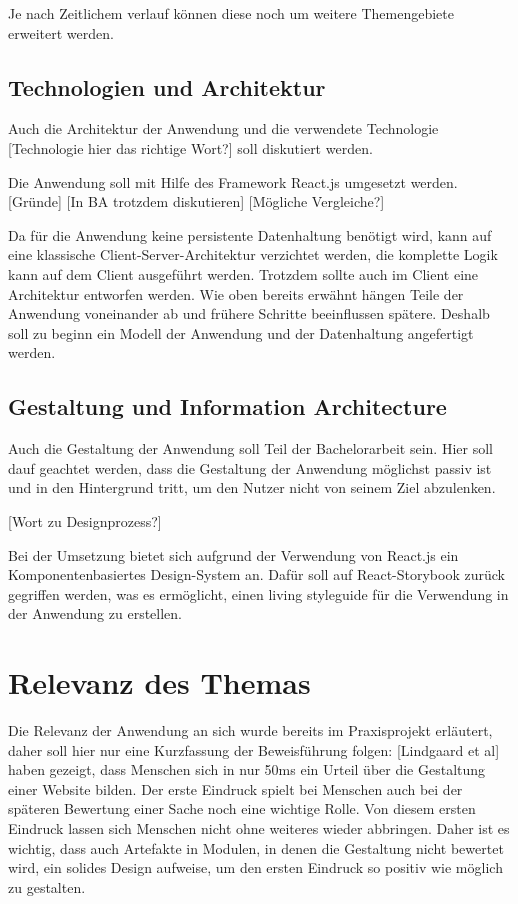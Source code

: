Je nach Zeitlichem verlauf können diese noch um weitere Themengebiete erweitert werden.

\subsection{Technologien und Architektur}
Auch die Architektur der Anwendung und die verwendete Technologie [Technologie hier das richtige Wort?] soll diskutiert werden.

Die Anwendung soll mit Hilfe des Framework React.js umgesetzt werden.
[Gründe]
[In BA trotzdem diskutieren]
[Mögliche Vergleiche?]

Da für die Anwendung keine persistente Datenhaltung benötigt wird, kann auf eine klassische Client-Server-Architektur verzichtet werden, die komplette Logik kann auf dem Client ausgeführt werden.
Trotzdem sollte auch im Client eine Architektur entworfen werden. Wie oben bereits erwähnt hängen Teile der Anwendung voneinander ab und frühere Schritte beeinflussen spätere. Deshalb soll zu beginn ein Modell der Anwendung und der Datenhaltung angefertigt werden.

\subsection{Gestaltung und Information Architecture}
Auch die Gestaltung der Anwendung soll Teil der Bachelorarbeit sein. Hier soll dauf geachtet werden, dass die Gestaltung der Anwendung möglichst passiv ist und in den Hintergrund tritt, um den Nutzer nicht von seinem Ziel abzulenken.

[Wort zu Designprozess?]

Bei der Umsetzung bietet sich aufgrund der Verwendung von React.js ein Komponentenbasiertes Design-System an. Dafür soll auf React-Storybook zurück gegriffen werden, was es ermöglicht, einen living styleguide für die Verwendung in der Anwendung zu erstellen.

\section{Relevanz des Themas}
Die Relevanz der Anwendung an sich wurde bereits im Praxisprojekt erläutert, daher soll hier nur eine Kurzfassung der Beweisführung folgen:
[Lindgaard et al] haben gezeigt, dass Menschen sich in nur 50ms ein Urteil über die Gestaltung einer Website bilden. Der erste Eindruck spielt bei Menschen auch bei der späteren Bewertung einer Sache noch eine wichtige Rolle.  Von diesem ersten Eindruck lassen sich Menschen nicht ohne weiteres wieder abbringen.
Daher ist es wichtig, dass auch Artefakte in Modulen, in denen die Gestaltung nicht bewertet wird, ein solides Design aufweise, um den ersten Eindruck so positiv wie möglich zu gestalten.

